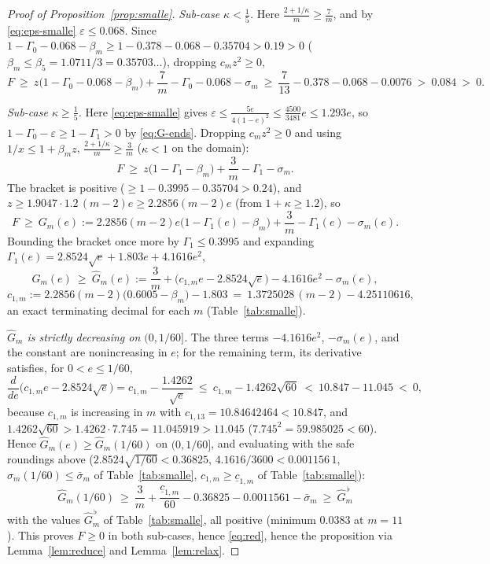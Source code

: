 \documentclass[11pt]{amsart}
\newcommand{\eps}{\varepsilon}
\begin{document}
\begin{proof}[Proof of Proposition~\ref{prop:smalle}]
\emph{Sub-case $\kappa<\tfrac15$.}  Here $\frac{2+1/\kappa}m\ge\frac7m$, and
by \eqref{eq:eps-smalle} $\eps\le0.068$.  Since
$1-\Gamma_0-0.068-\beta_m\ge1-0.378-0.068-0.35704>0.19>0$
($\beta_m\le\beta_5=1.0711/3=0.35703\ldots$), dropping $c_mz^2\ge0$,
\[
 F\ \ge\ z\bigl(1-\Gamma_0-0.068-\beta_m\bigr)+\frac7m-\Gamma_0-0.068-\sigma_m
 \ \ge\ \frac7{13}-0.378-0.068-0.0076\ >\ 0.084\ >\ 0 .
\]

\emph{Sub-case $\kappa\ge\tfrac15$.}  Here \eqref{eq:eps-smalle} gives
$\eps\le\frac{5e}{4(1-e)^2}\le\frac{4500}{3481}e\le1.293e$, so
$1-\Gamma_0-\eps\ge1-\Gamma_1>0$ by \eqref{eq:G-ends}.  Dropping
$c_mz^2\ge0$ and using $1/x\le1+\beta_mz$, $\frac{2+1/\kappa}m\ge\frac3m$
($\kappa<1$ on the domain):
\[
 F\ \ge\ z\bigl(1-\Gamma_1-\beta_m\bigr)+\frac3m-\Gamma_1-\sigma_m .
\]
The bracket is positive ($\ge1-0.3995-0.35704>0.24$), and
$z\ge1.9047\cdot1.2\,(m-2)e\ge2.2856(m-2)e$ (from $1+\kappa\ge1.2$), so
\begin{equation}\label{eq:Gm}
 F\ \ge\ G_m(e):=2.2856(m-2)e\bigl(1-\Gamma_1(e)-\beta_m\bigr)
 +\frac3m-\Gamma_1(e)-\sigma_m(e) .
\end{equation}
Bounding the bracket once more by $\Gamma_1\le0.3995$ and expanding
$\Gamma_1(e)=2.8524\sqrt e+1.803e+4.1616e^2$,
\begin{equation}\label{eq:Ghat}
 G_m(e)\ \ge\ \widehat G_m(e):=\frac3m+\bigl(c_{1,m}e-2.8524\sqrt e\bigr)
 -4.1616e^2-\sigma_m(e),
\end{equation}
\begin{equation}\label{eq:c1}
 c_{1,m}:=2.2856(m-2)\bigl(0.6005-\beta_m\bigr)-1.803
 \ =\ 1.3725028\,(m-2)-4.25110616,
\end{equation}
an exact terminating decimal for each $m$ (Table~\ref{tab:smalle}).

\emph{$\widehat G_m$ is strictly decreasing on $(0,1/60]$.}  The three terms
$-4.1616e^2$, $-\sigma_m(e)$, and the constant are nonincreasing in $e$; for
the remaining term, its derivative satisfies, for $0<e\le1/60$,
\[
 \frac{d}{de}\bigl(c_{1,m}e-2.8524\sqrt e\bigr)
 =c_{1,m}-\frac{1.4262}{\sqrt e}
 \ \le\ c_{1,m}-1.4262\sqrt{60}
 \ <\ 10.847-11.045\ <\ 0,
\]
because $c_{1,m}$ is increasing in $m$ with
$c_{1,13}=10.84642464<10.847$, and
$1.4262\sqrt{60}>1.4262\cdot7.745=11.045919>11.045$
($7.745^2=59.985025<60$).  Hence
$\widehat G_m(e)\ge\widehat G_m(1/60)$ on $(0,1/60]$, and evaluating with
the safe roundings above ($2.8524\sqrt{1/60}<0.36825$,
$4.1616/3600<0.001156\,1$, $\sigma_m(1/60)\le\bar\sigma_m$ of
Table~\ref{tab:smalle}, $c_{1,m}\ge\underline c_{1,m}$ of
Table~\ref{tab:smalle}):
\[
 \widehat G_m(1/60)\ \ge\ \frac3m+\frac{\underline c_{1,m}}{60}
 -0.36825-0.0011561-\bar\sigma_m\ \ge\ \widehat G_m^{\,\flat}
\]
with the values $\widehat G_m^{\,\flat}$ of Table~\ref{tab:smalle}, all
positive (minimum $0.0383$ at $m=11$).  This proves $F\ge0$ in both
sub-cases, hence \eqref{eq:red}, hence the proposition via
Lemma~\ref{lem:reduce} and Lemma~\ref{lem:relax}.
\end{proof}
\end{document}
